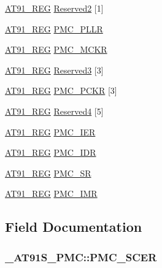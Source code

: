 \begin{CompactItemize}
\item 
\hyperlink{AT91SAM7X256_8h_712ad5a1ac1bd02f3e95a7526c283ce1}{AT91\_\-REG} \hyperlink{struct__AT91S__PMC_41029227f612f1bf9f802d606fee55af}{Reserved2} \mbox{[}1\mbox{]}
\item 
\hyperlink{AT91SAM7X256_8h_712ad5a1ac1bd02f3e95a7526c283ce1}{AT91\_\-REG} \hyperlink{struct__AT91S__PMC_5e9f5310c24be113b680a6bd890d5813}{PMC\_\-PLLR}
\item 
\hyperlink{AT91SAM7X256_8h_712ad5a1ac1bd02f3e95a7526c283ce1}{AT91\_\-REG} \hyperlink{struct__AT91S__PMC_7172b8a93b54c122f4e7ca6c6aa6520c}{PMC\_\-MCKR}
\item 
\hyperlink{AT91SAM7X256_8h_712ad5a1ac1bd02f3e95a7526c283ce1}{AT91\_\-REG} \hyperlink{struct__AT91S__PMC_02606d2b8a0950a0c616d5572d2e5a18}{Reserved3} \mbox{[}3\mbox{]}
\item 
\hyperlink{AT91SAM7X256_8h_712ad5a1ac1bd02f3e95a7526c283ce1}{AT91\_\-REG} \hyperlink{struct__AT91S__PMC_ac8a948cb33750b1a43e09bc6fbd7903}{PMC\_\-PCKR} \mbox{[}3\mbox{]}
\item 
\hyperlink{AT91SAM7X256_8h_712ad5a1ac1bd02f3e95a7526c283ce1}{AT91\_\-REG} \hyperlink{struct__AT91S__PMC_bb9536acde7a8b8e1718206dda8c7032}{Reserved4} \mbox{[}5\mbox{]}
\item 
\hyperlink{AT91SAM7X256_8h_712ad5a1ac1bd02f3e95a7526c283ce1}{AT91\_\-REG} \hyperlink{struct__AT91S__PMC_5be217ac50dbfcfb9c812e1755db216b}{PMC\_\-IER}
\item 
\hyperlink{AT91SAM7X256_8h_712ad5a1ac1bd02f3e95a7526c283ce1}{AT91\_\-REG} \hyperlink{struct__AT91S__PMC_e6dfa86a226b1526fe2ff35ebf29aae4}{PMC\_\-IDR}
\item 
\hyperlink{AT91SAM7X256_8h_712ad5a1ac1bd02f3e95a7526c283ce1}{AT91\_\-REG} \hyperlink{struct__AT91S__PMC_3818bbc0ea23c8beef3797db1be2d36e}{PMC\_\-SR}
\item 
\hyperlink{AT91SAM7X256_8h_712ad5a1ac1bd02f3e95a7526c283ce1}{AT91\_\-REG} \hyperlink{struct__AT91S__PMC_fb4ef7a28b15f03474fdf8e69a8968c0}{PMC\_\-IMR}
\end{CompactItemize}


\subsection{Field Documentation}
\hypertarget{struct__AT91S__PMC_8b9d2ec1773c1ab2ba294d722fc44c00}{
\subsubsection{ {\bf \_\-AT91S\_\-PMC::PMC\_\-SCER}}}
\label{struct__AT91S__PMC_8b9d2ec1773c1ab2ba294d722fc44c00}




